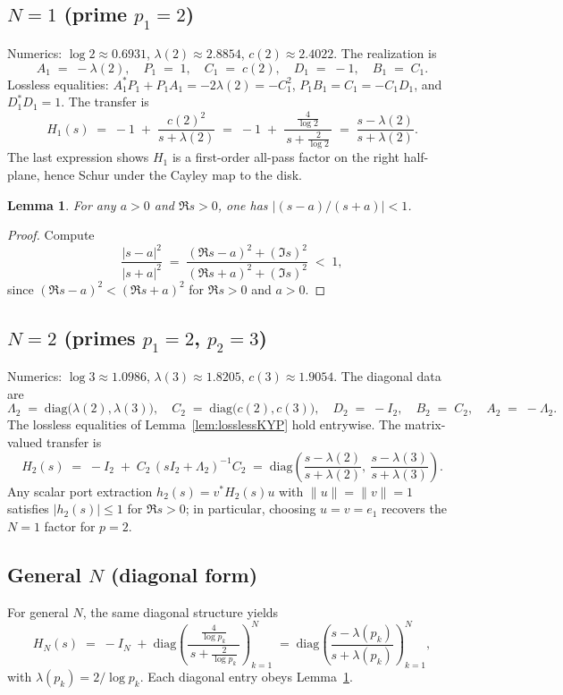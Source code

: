 \documentclass[11pt]{article}
\newtheorem{lemma}[theorem]{Lemma}
\theoremstyle{remark}
\begin{document}
\subsection*{$N=1$ (prime $p_1=2$)}
Numerics: \(\log 2\approx 0.6931\), \(\lambda(2)\approx 2.8854\), \(c(2)\approx 2.4022\). The realization is
\[
 A_1\;=\;-\lambda(2),\quad P_1\;=\;1,\quad C_1\;=\;c(2),\quad D_1\;=\;-1,\quad B_1\;=\;C_1.
\]
Lossless equalities: \(A_1^*P_1+P_1A_1=-2\lambda(2)=-C_1^2\), \(P_1B_1=C_1=-C_1 D_1\), and \(D_1^*D_1=1\). The transfer is
\[
 H_1(s)\;=\;-1\; +\; \frac{c(2)^2}{s+\lambda(2)}\;=\;-1\; +\;\frac{\tfrac{4}{\log 2}}{\,s+\tfrac{2}{\log 2}\,}\;=\;\frac{s-\lambda(2)}{s+\lambda(2)}.
\]
The last expression shows \(H_1\) is a first-order all-pass factor on the right half-plane, hence Schur under the Cayley map to the disk.

\begin{lemma}\label{lem:moebius-contract}
For any \(a>0\) and \(\Re s>0\), one has \(\big|(s-a)/(s+a)\big|<1\).
\end{lemma}
\begin{proof}
Compute
\[
 \frac{|s-a|^2}{|s+a|^2}\;=\;\frac{(\Re s-a)^2+(\Im s)^2}{(\Re s+a)^2+(\Im s)^2}\;<\;1,
\]
since \((\Re s-a)^2<(\Re s+a)^2\) for \(\Re s>0\) and \(a>0\).
\end{proof}

\subsection*{$N=2$ (primes $p_1=2$, $p_2=3$)}
Numerics: \(\log 3\approx 1.0986\), \(\lambda(3)\approx 1.8205\), \(c(3)\approx 1.9054\). The diagonal data are
\[
 \Lambda_2\;=\;\mathrm{diag}\big(\lambda(2),\lambda(3)\big),\quad C_2\;=\;\mathrm{diag}\big(c(2),c(3)\big),\quad D_2\;=\;-I_2,\quad B_2\;=\;C_2,\quad A_2\;=\;-\Lambda_2.
\]
The lossless equalities of Lemma~\ref{lem:losslessKYP} hold entrywise. The matrix-valued transfer is
\[
 H_2(s)\;=\;-I_2\; +\; C_2\,(sI_2+\Lambda_2)^{-1} C_2\;=\;\mathrm{diag}\!\left(\frac{s-\lambda(2)}{s+\lambda(2)},\ \frac{s-\lambda(3)}{s+\lambda(3)}\right).
\]
Any scalar port extraction \(h_2(s)=v^*H_2(s)u\) with \(\|u\|=\|v\|=1\) satisfies \(|h_2(s)|\le 1\) for \(\Re s>0\); in particular, choosing \(u=v=e_1\) recovers the \(N=1\) factor for \(p=2\).

\subsection*{General $N$ (diagonal form)}
For general \(N\), the same diagonal structure yields
\[
 H_N(s)\;=\;-I_N\; +\; \mathrm{diag}\!\left(\frac{\tfrac{4}{\log p_k}}{\,s+\tfrac{2}{\log p_k}\,}\right)_{k=1}^N\;=\;\mathrm{diag}\!\left(\frac{s-\lambda(p_k)}{s+\lambda(p_k)}\right)_{k=1}^N,
\]
with \(\lambda(p_k)=2/\log p_k\). Each diagonal entry obeys Lemma~\ref{lem:moebius-contract}.
\end{document}
